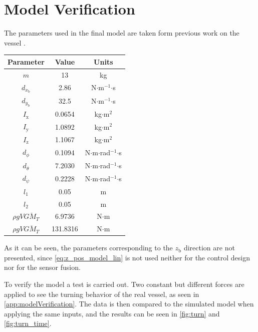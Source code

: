 \section{Model Verification}\label{sec:modelVerification}
The parameters used in the final model are taken form previous work on the vessel \cite{thesis}.

\begin{table}[H]
    \begin{tabular}{|c|c|c|}    
        \hline %
        \textbf{Parameter} &\textbf{Value} & \textbf{Units} \\
        \hline %
        $m$  & 13 & kg \\
        $d_{\dot{x}_\mathrm{b}}$  & 2.86 & N$\cdot$m$^{-1}$$\cdot$s \\
        $d_{\dot{y}_\mathrm{b}}$  & 32.5 & N$\cdot$m$^{-1}$$\cdot$s \\
        $I_\mathrm{x}$  & 0.0654 & kg$\cdot$m$^2$ \\
        $I_\mathrm{y}$  & 1.0892 & kg$\cdot$m$^2$ \\
        $I_\mathrm{z}$  & 1.1067 & kg$\cdot$m$^2$ \\
        $d_{\dot{\phi}}$ & 0.1094 &  N$\cdot$m$\cdot$rad$^{-1}$$\cdot$s\\
        $d_{\dot{\theta}}$ & 7.2030 & N$\cdot$m$\cdot$rad$^{-1}$$\cdot$s \\
        $d_{\dot{\psi}}$ & 0.2228 & N$\cdot$m$\cdot$rad$^{-1}$$\cdot$s \\
        $l_1$ & 0.05 & m \\
        $l_2$ & 0.05 & m \\
        $\rho g V \overline{GM_{T}}$ & 6.9736 & N$\cdot$m\\
        $\rho g V \overline{GM_{T}}$ & 131.8316 & N$\cdot$m\\
        \hline %
    \end{tabular}
\end{table}

As it can be seen, the parameters corresponding to the $z_\mathrm{b}$ direction are not presented, since \autoref{eq:z_pos_model_lin} is not used neither for the control design nor for the sensor fusion.

To verify the model a test is carried out. Two constant but different forces are applied to see the turning behavior of the real vessel, as seen in \autoref{app:modelVerification}. The data is then compared to the simulated model when applying the same inputs, and the results can be seen in \autoref{fig:turn} and \ref{fig:turn_time}.

